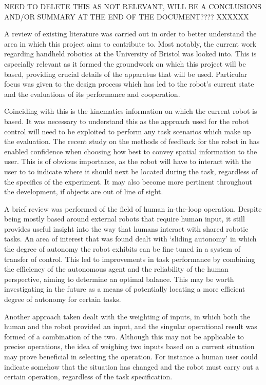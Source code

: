 \documentclass[11pt]{article}
\begin{document}
NEED TO DELETE THIS AS NOT RELEVANT, WILL BE A CONCLUSIONS AND/OR SUMMARY AT THE END OF THE DOCUMENT???? XXXXXX

A review of existing literature was carried out in order to better understand the area in which this project aims to contribute to. Most notably, the current work regarding handheld robotics at the University of Bristol was looked into. This is especially relevant as it formed the groundwork on which this project will be based,  providing crucial details of the apparatus that will be used. Particular focus was given to the design process which has led to the robot's current state and the evaluations of its performance and cooperation. 

Coinciding with this is the kinematics information on which the current robot is based. It was necessary to understand this as the approach used for the robot control will need to be exploited to perform any task scenarios which make up the evaluation. The recent study on the methods of feedback for the robot in \cite{GreggSmithFeedback} has enabled confidence when choosing how best to convey spatial information to the user. This is of obvious importance, as the robot will have to interact with the user to to indicate where it should next be located during the task, regardless of the specifics of the experiment. It may also become more pertinent throughout the development, if objects are out of line of sight.

A brief review was performed of the field of human in-the-loop operation. Despite being mostly based around external robots that require human input, it still provides useful insight into the way that humans interact with shared robotic tasks. An area of interest that was found dealt with `sliding autonomy' in which the degree of autonomy the robot exhibits can be fine tuned in a system of transfer of control. This led to improvements in task performance by combining the efficiency of the autonomous agent and the reliability of the human perspective, aiming to determine an optimal balance. This may be worth investigating in the future as a means of potentially locating a more efficient degree of autonomy for certain tasks. 

Another approach taken dealt with the weighting of inputs, in which both the human and the robot provided an input, and the singular operational result was formed of a combination of the two. Although this may not be applicable to precise operations, the idea of weighing two inputs based on a current situation may prove beneficial in selecting the operation. For instance a human user could indicate somehow that the situation has changed and the robot must carry out a certain operation, regardless of the task specification.
\end{document}
